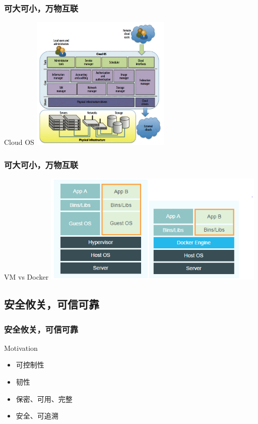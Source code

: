 \begin{frame}
\frametitle{可大可小，万物互联}
\begin{block}{Cloud OS}
\centering
\includegraphics[width=0.5\textwidth]{fig23/cloudos.jpg}
\end{block}
\end{frame}



\begin{frame}
\frametitle{可大可小，万物互联}
\begin{block}{VM vs Docker}
\centering
\includegraphics[width=0.8\textwidth]{fig23/docker.jpg}
\end{block}
\end{frame}




\subsection{安全攸关，可信可靠}

\begin{frame}
\frametitle{安全攸关，可信可靠}
\begin{block}{Motivation}
\begin{itemize}
	\item 可控制性
	\item 韧性
	\item 保密、可用、完整
	\item 安全、可追溯
\end{itemize} 
\end{block}
\end{frame}


